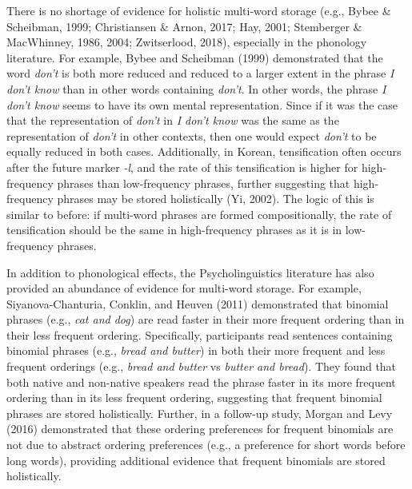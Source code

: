 \documentclass[
  man,floatsintext]{apa6}
\begin{document}
There is no shortage of evidence for holistic multi-word storage (e.g., Bybee \& Scheibman, 1999; Christiansen \& Arnon, 2017; Hay, 2001; Stemberger \& MacWhinney, 1986, 2004; Zwitserlood, 2018), especially in the phonology literature. For example, Bybee and Scheibman (1999) demonstrated that the word \emph{don't} is both more reduced and reduced to a larger extent in the phrase \emph{I don't know} than in other words containing \emph{don't}. In other words, the phrase \emph{I don't know} seems to have its own mental representation. Since if it was the case that the representation of \emph{don't} in \emph{I don't know} was the same as the representation of \emph{don't} in other contexts, then one would expect \emph{don't} to be equally reduced in both cases. Additionally, in Korean, tensification often occurs after the future marker \emph{-l}, and the rate of this tensification is higher for high-frequency phrases than low-frequency phrases, further suggesting that high-frequency phrases may be stored holistically (Yi, 2002). The logic of this is similar to before: if multi-word phrases are formed compositionally, the rate of tensification should be the same in high-frequency phrases as it is in low-frequency phrases.

In addition to phonological effects, the Psycholinguistics literature has also provided an abundance of evidence for multi-word storage. For example, Siyanova-Chanturia, Conklin, and Heuven (2011) demonstrated that binomial phrases (e.g., \emph{cat and dog}) are read faster in their more frequent ordering than in their less frequent ordering. Specifically, participants read sentences containing binomial phrases (e.g., \emph{bread and butter}) in both their more frequent and less frequent orderings (e.g., \emph{bread and butter} vs \emph{butter and bread}). They found that both native and non-native speakers read the phrase faster in its more frequent ordering than in its less frequent ordering, suggesting that frequent binomial phrases are stored holistically. Further, in a follow-up study, Morgan and Levy (2016) demonstrated that these ordering preferences for frequent binomials are not due to abstract ordering preferences (e.g., a preference for short words before long words), providing additional evidence that frequent binomials are stored holistically.
\end{document}
